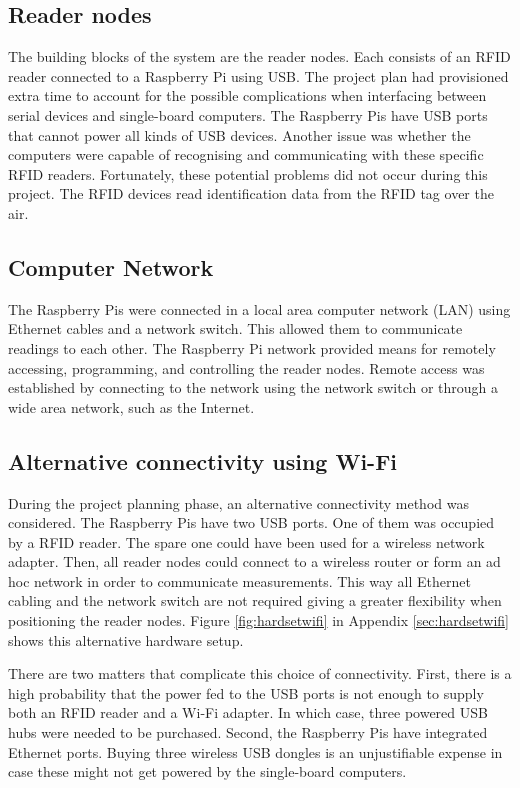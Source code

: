 \subsection{Reader nodes}

The building blocks of the system are the reader nodes. Each consists of an RFID reader connected to a Raspberry Pi using USB. The project plan had provisioned extra time to account for the possible complications when interfacing between serial devices and single-board computers. The Raspberry Pis have USB ports that cannot power all kinds of USB devices. Another issue was whether the computers were capable of recognising and communicating with these specific RFID readers. Fortunately, these potential problems did not occur during this project. The RFID devices read identification data from the RFID tag over the air.

\subsection{Computer Network}

The Raspberry Pis were connected in a local area computer network (LAN) using Ethernet cables and a network switch. This allowed them to communicate readings to each other. The Raspberry Pi network provided means for remotely accessing, programming, and controlling the reader nodes. Remote access was established by connecting to the network using the network switch or through a wide area network, such as the Internet.


\subsection{Alternative connectivity using Wi-Fi}

During the project planning phase, an alternative connectivity method was considered. The Raspberry Pis have two USB ports. One of them was occupied by a RFID reader. The spare one could have been used for a wireless network adapter. Then, all reader nodes could connect to a wireless router or form an ad hoc network in order to communicate measurements. This way all Ethernet cabling and the network switch are not required giving a greater flexibility when positioning the reader nodes. Figure \ref{fig:hardsetwifi} in Appendix \ref{sec:hardsetwifi} shows this alternative hardware setup.

There are two matters that complicate this choice of connectivity. First, there is a high probability that the power fed to the USB ports is not enough to supply both an RFID reader and a Wi-Fi adapter. In which case, three powered USB hubs were needed to be purchased. Second, the Raspberry Pis have integrated Ethernet ports. Buying three wireless USB dongles is an unjustifiable expense in case these might not get powered by the single-board computers.

